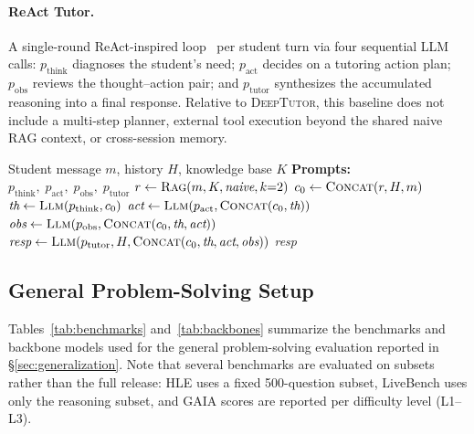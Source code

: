 \paragraph{ReAct Tutor.}
A single-round ReAct-inspired loop~\citep{yao2023reactsynergizingreasoningacting} per student turn via four sequential LLM calls: $p_{\text{think}}$ diagnoses the student's need; $p_{\text{act}}$ decides on a tutoring action plan; $p_{\text{obs}}$ reviews the thought--action pair; and $p_{\text{tutor}}$ synthesizes the accumulated reasoning into a final response.
Relative to \textsc{DeepTutor}, this baseline does not include a multi-step planner, external tool execution beyond the shared naive RAG context, or cross-session memory.

\begin{algorithm}[ht!]
\caption{ReAct Tutor (single-round per turn)}\label{alg:react}
\small
\begin{algorithmic}[1]
\Require Student message $m$, history $H$, knowledge base $K$
\Statex \textbf{Prompts:} $p_{\text{think}},\; p_{\text{act}},\; p_{\text{obs}},\; p_{\text{tutor}}$
\State $r \gets \textsc{Rag}(m, K, \textit{naive}, k{=}2)$
\State $c_0 \gets \textsc{Concat}(r, H, m)$ 
\State $\textit{th} \gets \textsc{Llm}(p_{\text{think}}, c_0)$ 
\State $\textit{act} \gets \textsc{Llm}(p_{\text{act}}, \textsc{Concat}(c_0, \textit{th}))$ 
\State $\textit{obs} \gets \textsc{Llm}(p_{\text{obs}}, \textsc{Concat}(c_0, \textit{th}, \textit{act}))$ 
\State $\textit{resp} \gets \textsc{Llm}(p_{\text{tutor}}, H, \textsc{Concat}(c_0, \textit{th}, \textit{act}, \textit{obs}))$
\State \Return \textit{resp}
\end{algorithmic}
\end{algorithm}

\subsection{General Problem-Solving Setup}
\label{app:eval:general}

Tables~\ref{tab:benchmarks} and~\ref{tab:backbones} summarize the benchmarks and backbone models used for the general problem-solving evaluation reported in \S\ref{sec:generalization}.
Note that several benchmarks are evaluated on subsets rather than the full release: HLE uses a fixed 500-question subset, LiveBench uses only the reasoning subset, and GAIA scores are reported per difficulty level (L1--L3).

